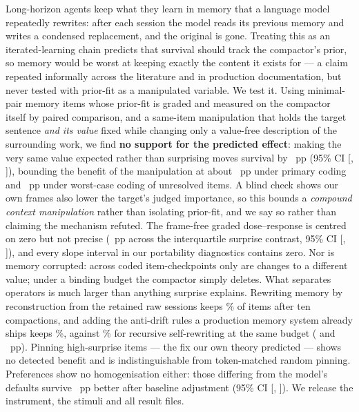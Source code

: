 Long-horizon agents keep what they learn in memory that a language model repeatedly rewrites: after
each session the model reads its previous memory and writes a condensed replacement, and the original
is gone. Treating this as an iterated-learning chain predicts that survival should track the
compactor's prior, so memory would be worst at keeping exactly the content it exists for --- a claim
repeated informally across the literature and in production documentation, but never tested with
prior-fit as a manipulated variable. We test it. Using
minimal-pair memory items whose prior-fit is graded and measured on the compactor itself by paired
comparison, and a same-item manipulation that holds the target sentence \emph{and its value} fixed
while changing only a value-free description of the surrounding work, we find \textbf{no support for
the predicted effect}: making the very same value expected rather than surprising moves survival by
\EShiftMean{}~pp (95\% CI [\EShiftCIlo{}, \EShiftCIhi{}]), bounding the benefit of the manipulation
at about \ConeUpper{}~pp under primary coding and \ConeUpperWorst{}~pp under worst-case coding of
unresolved items. A blind check shows our own frames also lower the target's judged importance, so
this bounds a \emph{compound context manipulation} rather than isolating prior-fit, and we say so
rather than claiming the mechanism refuted. The frame-free graded dose--response is centred on zero
but not precise (\DoseIQR{}~pp across the interquartile surprise contrast, 95\% CI [\DoseIQRlo{},
\DoseIQRhi{}]), and every slope interval in our portability diagnostics contains zero. Nor is memory corrupted: across \NCodedCases{} coded
item-checkpoints only \ChangedCount{} are changes to a different value; under a binding budget the
compactor simply deletes. What separates operators is much larger than anything surprise explains.
Rewriting memory by reconstruction from the retained raw sessions keeps \RetOfour{}\% of items after
ten compactions, and adding the anti-drift rules a production memory system already ships keeps
\RetOfive{}\%, against \RetOone{}\% for recursive self-rewriting at the same budget
(\ContrastOfour{} and \ContrastOfive{}~pp). Pinning high-surprise items --- the fix our own theory
predicted --- shows no detected benefit and is indistinguishable from token-matched random pinning.
Preferences show no homogenisation either: those differing from the model's defaults survive
\PrefAdj{}~pp better after baseline adjustment (95\% CI [\PrefAdjLo{}, \PrefAdjHi{}]). We release the
instrument, the stimuli and all result files.
